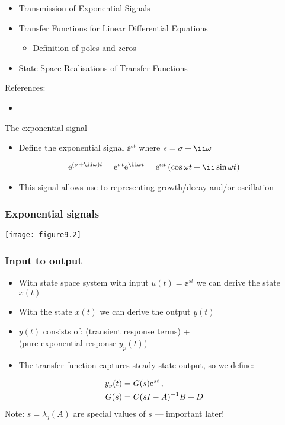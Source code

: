 \documentclass{beamer-control}
\begin{document}

\begin{SUMMARY}
\begin{itemize}
\item Transmission of Exponential Signals
\item Transfer Functions for Linear Differential Equations
\begin{itemize}
\item Definition of poles and zeros
\end{itemize}
\item State Space Realisations of Transfer Functions
\end{itemize}
\vfill References:
\begin{itemize}
\item {}
\end{itemize}
\end{SUMMARY}


\begin{frame}{The exponential signal}
\begin{itemize}
\item Define the \alert{exponential signal} $\ee^{st}$ where $s=\sigma+\ii\ww$
\end{itemize}
\begin{align}
\ee^{(\sigma+\ii\ww)t} = \ee^{\sigma t}\ee^{\ii\ww t} = \ee^{\alpha t}\left( \cos\ww t + \ii \sin \ww t \right)
\end{align}
\begin{itemize}
\item This signal allows use to representing growth/decay and/or oscillation
\end{itemize}
\end{frame}

\begin{frame}
\frametitle{Exponential signals}
\centering
\texttt{[image: figure9.2]}
\end{frame}

\begin{frame}
\frametitle{Input to output}
\begin{itemize}
\item
With state space system with input $u(t)=\ee^{st}$ we can derive the state $x(t)$
\item
With the state $x(t)$ we can derive the output $y(t)$
\item
$y(t)$ consists of: (transient response terms) + \\\hfill (pure exponential response $y_p(t)$)
\item
The transfer function captures steady state output, so we define:
\end{itemize}
\begin{align}
y_p(t) &= G(s) \mathrm{e}^{st} \,, \\
G(s) &= C(sI-A)^{-1} B + D
\end{align}
Note: $s=\lambda_j(A)$ are special values of $s$ --- important later!
\end{frame}
\end{document}
